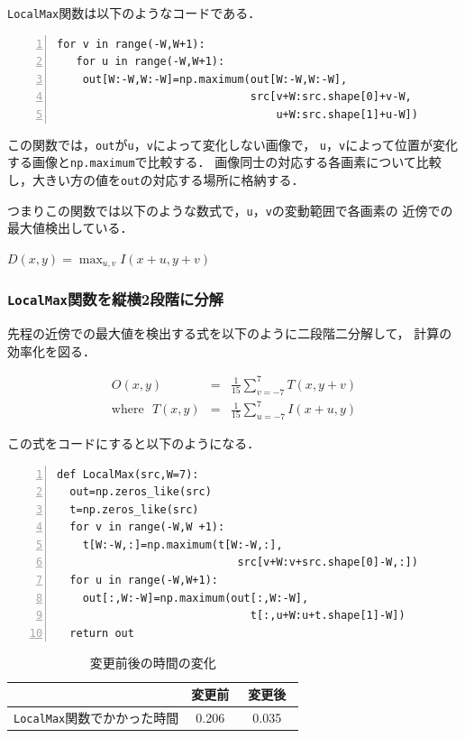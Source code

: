 \documentclass[autodetect-engine,dvi=dvipdfmx,ja=standard,
               a4j,11pt]{bxjsarticle}
\begin{document}
\verb|LocalMax|関数は以下のようなコードである．

\begin{Verbatim}[numbers=left, xleftmargin=10mm, numbersep=6pt,
                    fontsize=\small, baselinestretch=0.8]
  for v in range(-W,W+1):
   for u in range(-W,W+1):
    out[W:-W,W:-W]=np.maximum(out[W:-W,W:-W],
                              src[v+W:src.shape[0]+v-W,
                                  u+W:src.shape[1]+u-W])
\end{Verbatim}

この関数では，\verb|out|が\verb|u|，\verb|v|によって変化しない画像で，
\verb|u|，\verb|v|によって位置が変化する画像と\verb|np.maximum|で比較する．
画像同士の対応する各画素について比較し，大きい方の値を\verb|out|の対応する場所に格納する．

つまりこの関数では以下のような数式で，\verb|u|，\verb|v|の変動範囲で各画素の
近傍での最大値検出している．

$D(x,y)=\max_{u,v}I(x+u,y+v)$

\subsubsection{\texttt{LocalMax}関数を縦横2段階に分解}

先程の近傍での最大値を検出する式を以下のように二段階二分解して，
計算の効率化を図る．

\begin{eqnarray}
O(x,y)&=&\frac{1}{15}\sum_{v=-7}^{7} T(x,y+v) \\
\mbox{where}~~~ T(x,y)&=&\frac{1}{15}\sum_{u=-7}^{7}I(x+u,y)
\end{eqnarray}

この式をコードにすると以下のようになる．

\begin{Verbatim}[numbers=left, xleftmargin=10mm, numbersep=6pt,
                    fontsize=\small, baselinestretch=0.8]
def LocalMax(src,W=7):
  out=np.zeros_like(src)
  t=np.zeros_like(src)
  for v in range(-W,W +1):
    t[W:-W,:]=np.maximum(t[W:-W,:],
                            src[v+W:v+src.shape[0]-W,:])
  for u in range(-W,W+1):
    out[:,W:-W]=np.maximum(out[:,W:-W],
                              t[:,u+W:u+t.shape[1]-W])
  return out
\end{Verbatim}

\begin{table}[htbp]
\centering
\caption{変更前後の時間の変化}\label{table:5-2-1}
\begin{tabular}{|c||c|c|}
\hline
 & 変更前 & 変更後　\\
\hline
\texttt{LocalMax}関数でかかった時間 & 0.206 & 0.035 \\
\hline
\end{tabular}\end{table}
\end{document}
